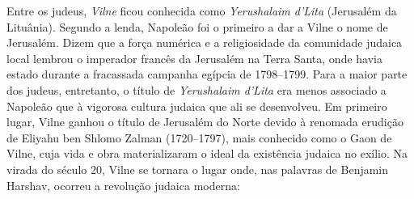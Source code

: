 %

Entre os judeus, \emph{Vilne} ficou conhecida como \emph{Yerushalaim
d'Lita} (Jerusalém da Lituânia). Segundo a lenda, Napoleão foi o
primeiro a dar a Vilne o nome de Jerusalém. Dizem que a força numérica e
a religiosidade da comunidade judaica local lembrou o imperador francês
da Jerusalém na Terra Santa, onde havia estado durante a fracassada
campanha egípcia de 1798--1799. Para a maior parte dos judeus,
entretanto, o título de \emph{Yerushalaim d'Lita} era menos associado a
Napoleão que à vigorosa cultura judaica que ali se desenvolveu. Em
primeiro lugar, Vilne ganhou o título de Jerusalém do Norte devido à
renomada erudição de Eliyahu ben Shlomo Zalman (1720--1797), mais
conhecido como o Gaon de Vilne, cuja vida e obra materializaram o ideal
da existência judaica no exílio. Na virada do século 20, Vilne se
tornara o lugar onde, nas palavras de Benjamin Harshav, ocorreu a
revolução judaica moderna:

